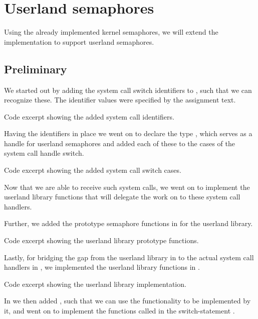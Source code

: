 %
%
%

\section{Userland semaphores}
Using the already implemented kernel semaphores, we will extend the
implementation to support userland semaphores.

\subsection{Preliminary}
We started out by adding the system call switch identifiers to
, such that we can recognize these. The identifier values
were specified by the assignment text.

{Code excerpt showing the added system call identifiers.}

Having the identifiers in place we went on to declare the 
type , which serves as a handle for userland
semaphores and added each of these to the cases of the system call handle
switch.

{Code excerpt showing the added system call switch cases.}

Now that we are able to receive such system calls, we went on to implement the
userland library functions that will delegate the work on to these system
call handlers. 

Further, we added the prototype semaphore functions in  for
the userland library.

{Code excerpt showing the userland library prototype functions.}

Lastly, for bridging the gap from the userland library in 
to the actual system call handlers in , we implemented
the userland library functions in .

{Code excerpt showing the userland library implementation.}

In  we then added ,
such that we can use the functionality to be implemented by it, and went on to
implement the functions called in the switch-statement
.

